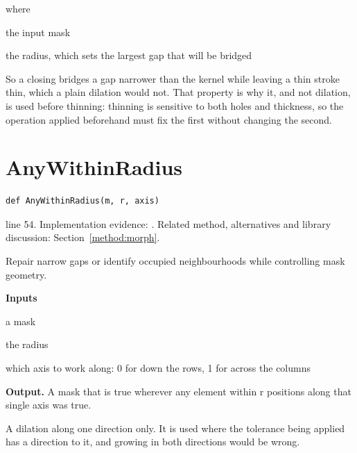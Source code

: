 \noindent where
\begin{description}[leftmargin=2.4em,style=nextline,font=\normalfont\ttfamily]\setlength\itemsep{1pt}
  \item[{$m$}] \normalfont the input mask
  \item[{$r$}] \normalfont the radius, which sets the largest gap that will be bridged
\end{description}
So a closing bridges a gap narrower than the kernel while leaving a thin stroke thin, which a plain dilation would not. That property is why it, and not dilation, is used before thinning: thinning is sensitive to both holes and thickness, so the operation applied beforehand must fix the first without changing the second.



\section{AnyWithinRadius}\label{fn:segment:AnyWithinRadius}
\begin{lstlisting}[style=sig]
def AnyWithinRadius(m, r, axis)
\end{lstlisting}
 line 54. Implementation evidence: \cite{code2026}. Related method, alternatives and library discussion: Section~\ref{method:morph}.


Repair narrow gaps or identify occupied neighbourhoods while controlling mask geometry.




\noindent\textbf{Inputs}
\begin{description}[leftmargin=2.2em,style=nextline,font=\normalfont\ttfamily]\setlength\itemsep{1pt}
  \item[{mask}] \normalfont a mask
  \item[{r}] \normalfont the radius
  \item[{axis}] \normalfont which axis to work along: 0 for down the rows, 1 for across the columns
\end{description}

\noindent\textbf{Output.} A mask that is true wherever any element within r positions along that single axis was true.


A dilation along one direction only. It is used where the tolerance being applied has a direction to it, and growing in both directions would be wrong.

